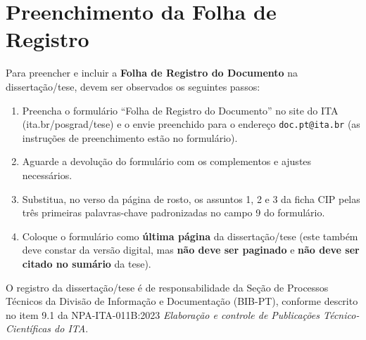\section{Preenchimento da Folha de Registro}

Para preencher e incluir a \textbf{Folha de Registro do Documento} na dissertação/tese, devem ser observados os seguintes passos:

\begin{enumerate}
    \item Preencha o formulário ``Folha de Registro do Documento'' no site do \ac{ITA} (ita.br/posgrad/tese) e o envie preenchido para o endereço \texttt{doc.pt@ita.br} (as instruções de preenchimento estão no formulário).

    \item Aguarde a devolução do formulário com os complementos e ajustes necessários.

    \item Substitua, no verso da página de rosto, os assuntos 1, 2 e 3 da ficha CIP pelas três primeiras palavras-chave padronizadas no campo 9 do formulário.

    \item Coloque o formulário como \textbf{última página} da dissertação/tese (este também deve constar da versão digital, mas \textbf{não deve ser paginado} e \textbf{não deve ser citado no sumário} da tese).
\end{enumerate}

O registro da dissertação/tese é de responsabilidade da Seção de Processos Técnicos da Divisão de Informação e Documentação (BIB-PT), conforme descrito no item 9.1 da NPA-ITA-011B:2023 \textit{Elaboração e controle de Publicações Técnico-Científicas do \ac{ITA}}.